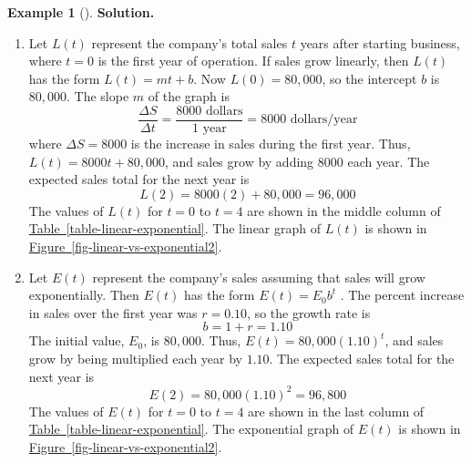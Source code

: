 \documentclass[10pt,]{book}
\theoremstyle{plain}
\theoremstyle{definition}
\theoremstyle{definition}
\theoremstyle{definition}
\newtheorem{example}[theorem]{Example}
\theoremstyle{definition}
\theoremstyle{definition}
\numberwithin{equation}{section}
\begin{document}
\begin{example}[]
%
\par\medskip\noindent%
\textbf{Solution.}\quad \leavevmode%
\begin{enumerate}[label=*\alph**]
\item\hypertarget{li-652}{}
            Let \(L(t)\) represent the company's total sales \(t\) years after starting business, where \(t = 0\) is the first year of operation. If sales grow linearly, then \(L(t)\) has the form \(L(t) = mt + b\). Now \(L(0) = 80,000\), so the intercept \(b\) is \(80,000\). The slope \(m\) of the graph is
            \begin{equation*}
                \frac{\Delta S}{\Delta t}= 
                \frac{8000 \text{ dollars}}{1\text{ year}}= 
                8000 \text{ dollars/year}
            \end{equation*}
            where \(\Delta S = 8000\) is the increase in sales during the first year. Thus, \(L(t) = 8000t + 80,000\), and sales grow by adding \textdollar{}\(8000\) each year. The expected sales total for the next year is
            \begin{equation*}
                L(2) = 8000(2) + 80,000 = 96,000
            \end{equation*}
            The values of \(L(t)\) for \(t=0\) to \(t=4\) are shown in the middle column of \hyperref[table-linear-exponential]{Table~\ref{table-linear-exponential}}. The linear graph of \(L(t)\) is shown in \hyperref[fig-linear-vs-exponential2]{Figure~\ref{fig-linear-vs-exponential2}}.
        \item\hypertarget{li-653}{}
            Let \(E(t)\) represent the company's sales assuming that sales will grow exponentially. Then \(E(t)\) has the form \(E(t) = E_0b^t\) . The percent increase in sales over the first year was \(r = 0.10\), so the growth rate is
            \begin{equation*}b = 1 + r = 1.10\end{equation*}
            The initial value, \(E_0\), is \(80,000\). Thus, \(E(t) = 80,000(1.10)^t\), and sales grow by being multiplied each year by \(1.10\). The expected sales total for the next year is
            \begin{equation*}
                E(2) = 80,000(1.10)^2= 96,800
            \end{equation*}
            The values of \(E(t)\) for \(t=0\) to \(t=4\) are shown in the last column of \hyperref[table-linear-exponential]{Table~\ref{table-linear-exponential}}. The exponential graph of \(E(t)\) is shown in \hyperref[fig-linear-vs-exponential2]{Figure~\ref{fig-linear-vs-exponential2}}.


\end{enumerate}
\end{example}
\end{document}
